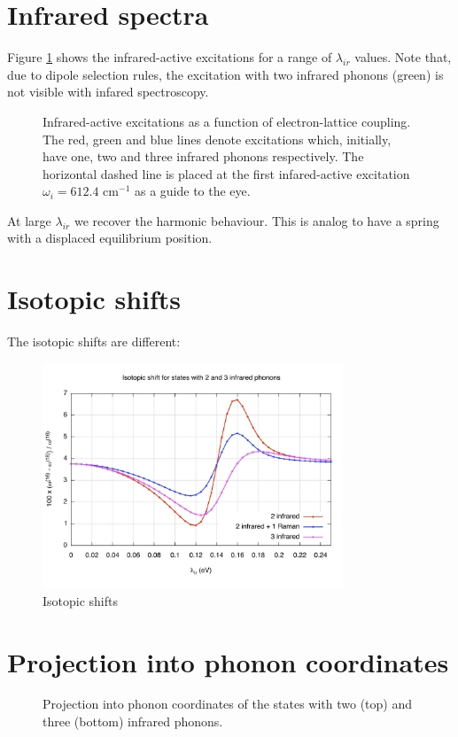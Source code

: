 \section{Infrared spectra}
\label{sec:irSpectra}

Figure \ref{fig:irSpectra} shows the infrared-active excitations for a range of $\lambda_{ir}$ values.
Note that, due to dipole selection rules, the excitation with two infrared phonons (green) is not visible with infared spectroscopy.

\begin{figure}
  \centering
  
  \caption[Infrared-active excitations as a function of electron-lattice coupling.]
  {Infrared-active excitations as a function of electron-lattice coupling.
  The red, green and blue lines denote excitations which, initially, have one, two and three infrared phonons respectively.
  The horizontal dashed line is placed at the first infared-active excitation $\omega_i=612.4$ cm$^{-1}$ as a guide to the eye.}
  \label{fig:irSpectra}
\end{figure}


At large $\lambda_{ir}$ we recover the harmonic behaviour. This is analog to have a spring with a displaced equilibrium position.


\section{Isotopic shifts}
\label{sec:irIsotopicShifts}

The isotopic shifts are different:

\begin{figure}[ht!]
  \centering
  \includegraphics[width=0.8\textwidth]{images/isot-2_3ir.jpg}
  \caption{Isotopic shifts}
  \label{fig:isot-2_3ir}
\end{figure}

\section{Projection into phonon coordinates}
\label{sec:irPhononProj}

\begin{figure}
  \centering
  
  \caption{Projection into phonon coordinates of the states with two (top) and three (bottom) infrared phonons.}
  \label{fig:phononProj2-3ir}
\end{figure}
